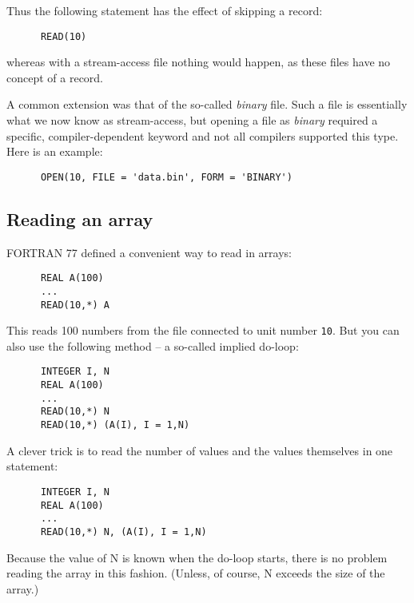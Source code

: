 Thus the following statement has the effect of skipping a record:
%
\begin{verbatim}
      READ(10)
\end{verbatim}
%
\noindent whereas with a stream-access file nothing would happen, as these files have no
concept of a record.

A common extension was that of the so-called \emph{binary} file. Such a file is essentially
what we now know as stream-access, but opening a file as \emph{binary} required a specific,
compiler-dependent keyword and not all compilers supported this type. Here is an example:
%
\begin{verbatim}
      OPEN(10, FILE = 'data.bin', FORM = 'BINARY')
\end{verbatim}


\subsection{Reading an array}
FORTRAN 77 defined a convenient way to read in arrays:
%
\begin{verbatim}
      REAL A(100)
      ...
      READ(10,*) A
\end{verbatim}
%
This reads 100 numbers from the file connected to unit number \verb+10+. But you can
also use the following method -- a so-called implied do-loop:
%
\begin{verbatim}
      INTEGER I, N
      REAL A(100)
      ...
      READ(10,*) N
      READ(10,*) (A(I), I = 1,N)
\end{verbatim}
%
A clever trick is to read the number of values and the values themselves in one statement:
%
\begin{verbatim}
      INTEGER I, N
      REAL A(100)
      ...
      READ(10,*) N, (A(I), I = 1,N)
\end{verbatim}
%
Because the value of N is known when the do-loop starts, there is no problem reading
the array in this fashion. (Unless, of course, N exceeds the size of the array.)
